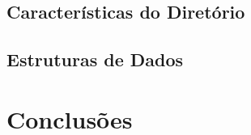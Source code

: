 \subsection{Características do Diretório}

\subsection{Estruturas de Dados}

\section{Conclusões}
\label{chap2:sec:concs}
